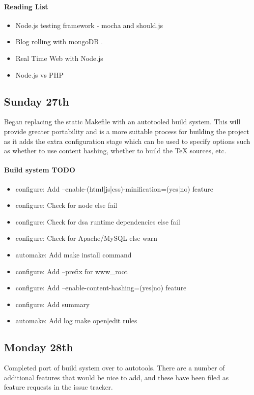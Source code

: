 \paragraph{Reading List}
\begin{itemize}
\item Node.js testing framework - mocha \cite{HolowaychukND} and should.js
  \cite{HolowaychukNDa}
\item Blog rolling with mongoDB \cite{Clemson2010}.
\item Real Time Web with Node.js \cite{CoursewareND}
\item Node.js vs PHP \cite{Webapplog2013}
\end{itemize}

\subsection{Sunday 27th}
Began replacing the static Makefile with an autotooled build system. This will
provide greater portability and is a more suitable process for building the
project as it adds the extra configuration stage which can be used to specify
options such as whether to use content hashing, whether to build the TeX
sources, etc.

\paragraph{Build system TODO}
\begin{itemize}
\item configure: Add --enable-(html|js|css)-minification=(yes|no) feature
\item configure: Check for node else fail
\item configure: Check for dsa runtime dependencies else fail
\item configure: Check for Apache/MySQL else warn
\item automake: Add make install command
\item configure: Add --prefix for www\_root
\item configure: Add --enable-content-hashing=(yes|no) feature
\item configure: Add summary
\item automake: Add log make open|edit rules
\end{itemize}

\subsection{Monday 28th}
Completed port of build system over to autotools. There are a number of
additional features that would be nice to add, and these have been filed as
feature requests in the issue tracker.\\

